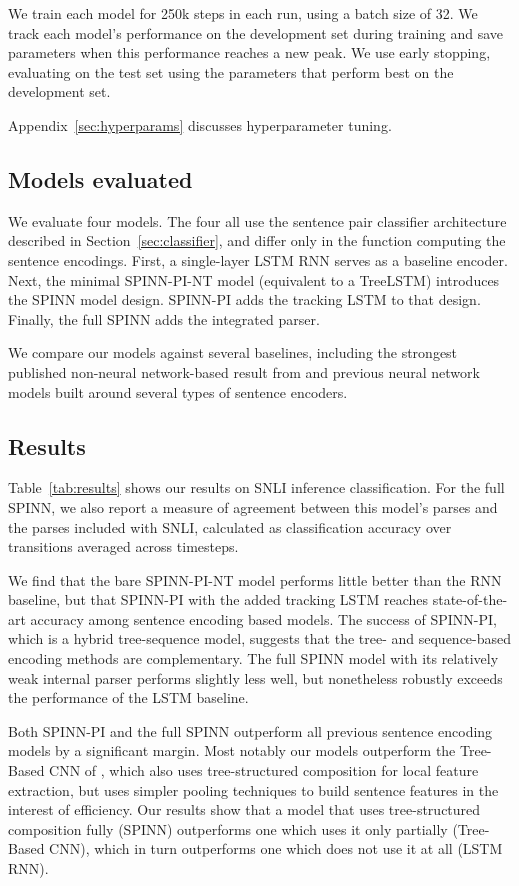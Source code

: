 \documentclass[11pt]{article}
\begin{document}
We train each model for 250k steps in each run, using a batch size of 32. We track each model's performance on the development set during training and save parameters when this performance reaches a new peak. We use early stopping, evaluating on the test set using the parameters that perform best on the development set.

Appendix~\ref{sec:hyperparams} discusses hyperparameter tuning.


\subsection{Models evaluated}

We evaluate four models. The four all use the sentence pair classifier architecture described in Section~\ref{sec:classifier}, and differ only in the function computing the sentence encodings. First, a single-layer LSTM RNN \citep[similar to that of][]{snli:emnlp2015} serves as a baseline encoder. Next, the minimal SPINN-PI-NT model (equivalent to a TreeLSTM) introduces the SPINN model design. SPINN-PI adds the tracking LSTM to that design. Finally, the full SPINN adds the integrated parser.

We compare our models against several baselines, including the strongest published non-neural network-based result from \citet{snli:emnlp2015} and previous neural network models built around several types of sentence encoders.

\subsection{Results}

Table~\ref{tab:results} shows our results on SNLI inference classification. For the full SPINN, we also report a measure of agreement between this model's parses and the parses included with SNLI, calculated as classification accuracy over transitions averaged across timesteps.

We find that the bare SPINN-PI-NT model performs little better than the RNN baseline, but that SPINN-PI with the added tracking LSTM reaches state-of-the-art accuracy among sentence encoding based models. The success of SPINN-PI, which is a hybrid tree-sequence model, suggests that the tree- and sequence-based encoding methods are complementary. The full SPINN model with its relatively weak internal parser performs slightly less well, but nonetheless robustly exceeds the performance of the LSTM baseline.

Both SPINN-PI and the full SPINN outperform all previous sentence encoding models by a significant margin. Most notably our models outperform the Tree-Based CNN of \citet{mou2015recognizing}, which also uses tree-structured composition for local feature extraction, but uses simpler pooling techniques to build sentence features in the interest of efficiency. Our results show that a model that uses tree-structured composition fully (SPINN) outperforms one which uses it only partially (Tree-Based CNN), which in turn outperforms one which does not use it at all (LSTM RNN).
\end{document}
